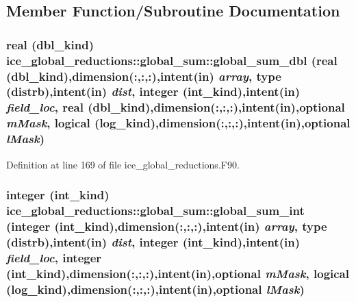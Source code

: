 \subsection{Member Function/Subroutine Documentation}
\hypertarget{interfaceice__global__reductions_1_1global__sum_a1190bcf6a3a0b414c8c2f481a79e0088}{
\subsubsection[{global\_\-sum\_\-dbl}]{\setlength{\rightskip}{0pt plus 5cm}real (dbl\_\-kind) ice\_\-global\_\-reductions::global\_\-sum::global\_\-sum\_\-dbl (real (dbl\_\-kind),dimension(:,:,:),intent(in) {\em array}, \/  type ({\bf distrb}),intent(in) {\em dist}, \/  integer (int\_\-kind),intent(in) {\em field\_\-loc}, \/  real (dbl\_\-kind),dimension(:,:,:),intent(in),optional {\em mMask}, \/  logical (log\_\-kind),dimension(:,:,:),intent(in),optional {\em lMask})}}
\label{interfaceice__global__reductions_1_1global__sum_a1190bcf6a3a0b414c8c2f481a79e0088}


Definition at line 169 of file ice\_\-global\_\-reductions.F90.\hypertarget{interfaceice__global__reductions_1_1global__sum_a644cf2af22aa7d96b1fe3325c528a1a5}{
\subsubsection[{global\_\-sum\_\-int}]{\setlength{\rightskip}{0pt plus 5cm}integer (int\_\-kind) ice\_\-global\_\-reductions::global\_\-sum::global\_\-sum\_\-int (integer (int\_\-kind),dimension(:,:,:),intent(in) {\em array}, \/  type ({\bf distrb}),intent(in) {\em dist}, \/  integer (int\_\-kind),intent(in) {\em field\_\-loc}, \/  integer (int\_\-kind),dimension(:,:,:),intent(in),optional {\em mMask}, \/  logical (log\_\-kind),dimension(:,:,:),intent(in),optional {\em lMask})}}
\label{interfaceice__global__reductions_1_1global__sum_a644cf2af22aa7d96b1fe3325c528a1a5}



